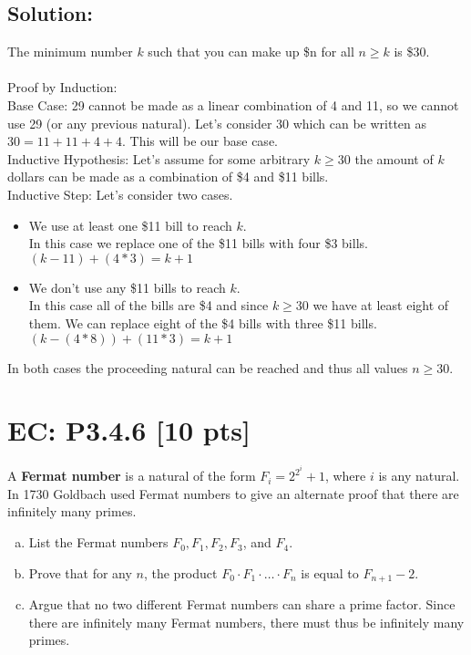 \documentclass[12pt]{article}
\begin{document}
\subsection*{\textbf{Solution:}}
The minimum number $k$ such that you can make up \$n for all $n \geq k$ is \$30.\\\\
Proof by Induction:\\

Base Case: 29 cannot be made as a linear combination of 4 and 11, so we cannot use 29 (or any previous natural). Let's consider 30 which can be written as $30 = 11+11+4+4$. This will be our base case.\\

Inductive Hypothesis: Let's assume for some arbitrary $k \geq 30$ the amount of $k$ dollars can be made as a combination of \$4 and \$11 bills.\\

Inductive Step: Let's consider two cases.
\begin{itemize}
	\item We use at least one \$11 bill to reach $k$.\\ In this case we replace one of the \$11 bills with four \$3 bills. $(k-11)+(4*3)=k+1$

	\item We don't use any \$11 bills to reach $k$.\\ In this case all of the bills are \$4 and since $k \geq 30$ we have at least eight of them. We can replace eight of the \$4 bills with three \$11 bills. $(k-(4*8))+(11*3)=k+1$
\end{itemize}
In both cases the proceeding natural can be reached and thus all values $n \geq 30$.

\newpage
\section*{\textbf{EC: P3.4.6} [10 pts]}
A \textbf{Fermat number} is a natural of the form $F_i = 2^{2^i} + 1$, where $i$ is any natural. In 1730 Goldbach used Fermat numbers to give an alternate proof that there are infinitely many primes.
\begin{enumerate}[(a)]

    \item List the Fermat numbers $F_0, F_1, F_2, F_3$, and $F_4$.
    
    \item Prove that for any $n$, the product $F_0 \cdot F_1 \cdot \ldots \cdot F_n$ is equal to $F_{n+1} - 2$. 
    
    \item Argue that no two different Fermat numbers can share a prime factor. Since there are infinitely many Fermat numbers, there must thus be infinitely many primes.
    
\end{enumerate}
\end{document}
